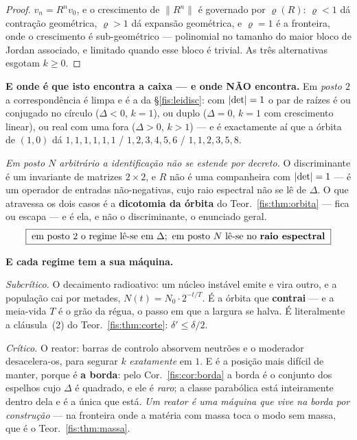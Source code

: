 \documentclass[livro.tex]{subfiles}
\begin{document}
\begin{proof}
$v_n=R^{n}v_0$, e o crescimento de $\lVert R^{n}\rVert$ é governado por
$\varrho(R)$:
$\varrho<1$ dá contração geométrica, $\varrho>1$ dá expansão geométrica, e
$\varrho=1$ é a fronteira, onde o crescimento é sub-geométrico --- polinomial no
tamanho do maior bloco de Jordan associado, e limitado quando esse bloco é
trivial. As três alternativas esgotam $k\ge0$.
\end{proof}

\medskip\noindent\textbf{E onde é que isto encontra a caixa --- e onde NÃO
encontra.} Em \emph{posto $2$} a correspondência é limpa e é a da
§\ref{fis:leidisc}: com $\lvert \det\rvert=1$ o par de raízes é ou conjugado no círculo
($\Delta<0$, $k=1$), ou duplo ($\Delta=0$, $k=1$ com crescimento linear), ou real
com uma fora ($\Delta>0$, $k>1$) --- e é exactamente aí que a órbita de $(1,0)$
dá $1,1,1,1,1,1$ / $1,2,3,4,5,6$ / $1,1,2,3,5,8$.

\medskip\noindent\emph{Em posto $N$ arbitrário a identificação não se estende
por decreto.} O discriminante é um invariante de matrizes $2\times2$, e $R$ não é
uma companheira com $\lvert \det\rvert=1$ --- é um operador de entradas não-negativas,
cujo raio espectral não se lê de $\Delta$. O que atravessa os dois casos é a
\textbf{dicotomia da órbita} do Teor.~\ref{fis:thm:orbita} --- fica ou escapa ---
e é ela, e não o discriminante, o enunciado geral.
\[
\boxed{\;\text{em posto }2\text{ o regime lê-se em }\Delta;\ \text{em posto }N
\text{ lê-se no \textbf{raio espectral}}\;}
\]

\medskip\noindent\textbf{E cada regime tem a sua máquina.}

\medskip\noindent\emph{Subcrítico.} O decaimento radioativo: um núcleo instável
emite e vira outro, e a população cai por metades,
$N(t)=N_0\cdot2^{-t/T}$. É a órbita que \textbf{contrai} --- e a meia-vida $T$ é
o grão da régua, o passo em que a largura se halva. É literalmente a cláusula~(2)
do Teor.~\ref{fis:thm:corte}: $\delta'\le\delta/2$.

\medskip\noindent\emph{Crítico.} O reator: barras de controlo absorvem neutrões e
o moderador desacelera-os, para segurar $k$ \emph{exatamente} em $1$. E é a
posição mais difícil de manter, porque é \textbf{a borda}: pelo
Cor.~\ref{fis:cor:borda} a borda é o conjunto dos espelhos cujo $\Delta$ é
quadrado, e ele é \emph{raro}; a classe parabólica está inteiramente dentro dela e
é a única que está. \emph{Um reator é uma máquina que vive na borda por
construção} --- na fronteira onde a matéria com massa toca o modo sem massa, que
é o Teor.~\ref{fis:thm:massa}.
\end{document}
